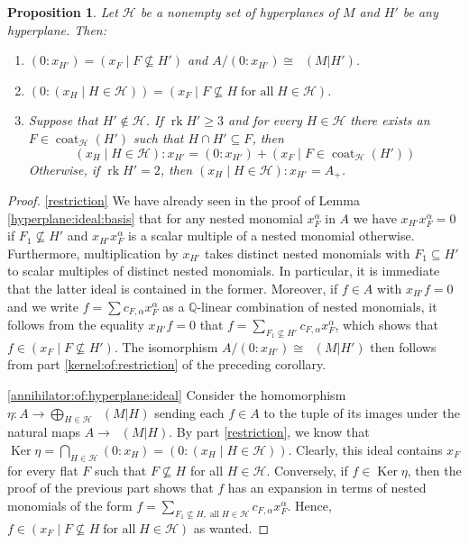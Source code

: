 \documentclass[11pt, reqno]{amsart}
\DeclareMathOperator{\Chow}{\underline{CH}}		%
\DeclareMathOperator{\coat}{coat}
\newcommand{\iso}{\cong}
\DeclareMathOperator{\Ker}{Ker}
\renewcommand{\ker}{\Ker}
\newcommand{\QQ}{\mathbb{Q}}
\DeclareMathOperator{\rk}{rk}
\newtheorem{prop}[thm]{Proposition}
\theoremstyle{definition}
\numberwithin{equation}{section}
\numberwithin{table}{section}
\begin{document}
\begin{spacing}{1.1}
\begin{prop} \label{colon:computations}
Let $\mathcal{H}$ be a nonempty set of hyperplanes of $M$ and $H'$ be any hyperplane.  Then:
\begin{enumerate}[label = \textnormal{(\alph*)}]

\item  \label{restriction}
$(0 : x_{H'}) = (x_F \mid F \nsubseteq H' )$ and $A/(0: x_{H'}) \iso \Chow(M\vert H')$.

\item \label{annihilator:of:hyperplane:ideal}
$(0 : (x_H \mid H \in \mathcal{H})) = (x_F \mid F \nsubseteq H \;\text{for all}\; H \in \mathcal{H})$.

\item \label{hyperplane:colons}
Suppose that $H' \notin \mathcal{H}$.  If $\rk H' \geq 3$ and for every $H \in \mathcal{H}$ there exists an $F \in \coat_\mathcal{H}(H')$ such that $H \cap H' \subseteq F$, then
\[
(x_H \mid H \in \mathcal{H}) : x_{H'} =  (0 : x_{H'}) + (x_F \mid F \in \coat_\mathcal{H}(H'))
\]
Otherwise, if $\rk H' = 2$, then $(x_H \mid H \in \mathcal{H}) : x_{H'} = A_+$. 
\end{enumerate}
\end{prop}

\begin{proof}

\ref{restriction}  We have already seen in the proof of Lemma \ref{hyperplane:ideal:basis} that for any nested monomial $x_F^\alpha$ in $A$ we have $x_{H'}x_F^\alpha = 0$ if $F_1 \nsubseteq H'$ and $x_{H'}x_F^\alpha$ is a scalar multiple of a nested monomial otherwise.  Furthermore, multiplication by $x_{H'}$ takes distinct nested monomials with $F_1 \subseteq H'$ to scalar multiples of distinct nested monomials.  In particular, it is immediate that the latter ideal is contained in the former.  Moreover, if $f \in A$ with $x_{H'}f = 0$ and we write $f = \sum c_{F, \alpha} x_F^\alpha$ as a $\QQ$-linear combination of nested monomials, it follows from the equality $x_{H'}f = 0$ that $f = \sum_{F_1 \nsubseteq H'} c_{F, \alpha} x_F^\alpha$, which shows that $f \in (x_F \mid F \nsubseteq H')$.  The isomorphism $A/(0 : x_{H'}) \iso \Chow(M\vert H')$ then follows from part \ref{kernel:of:restriction} of the preceding corollary.

\ref{annihilator:of:hyperplane:ideal}  Consider the homomorphism $\eta: A \to \bigoplus_{H \in \mathcal{H}} \Chow(M\vert H)$ sending each $f \in A$ to the tuple of its images under the natural maps $A \to \Chow(M\vert H)$.  By part \ref{restriction}, we know that $\ker \eta = \bigcap_{H \in \mathcal{H}} (0 : x_H) = (0 : (x_H \mid H \in \mathcal{H}))$.  Clearly, this ideal contains $x_F$ for every flat $F$ such that $F \nsubseteq H$ for all $H \in \mathcal{H}$.  Conversely, if $f \in \ker \eta$, then the proof of the previous part shows that $f$ has an expansion in terms of nested monomials of the form $f = \sum_{F_1 \nsubseteq H, \;\text{all}\; H \in \mathcal{H}} c_{F, \alpha} x_F^\alpha$.  Hence, $f \in (x_F \mid F \nsubseteq H \;\text{for all}\; H \in \mathcal{H})$ as wanted.


\end{proof}
\end{spacing}
\end{document}
